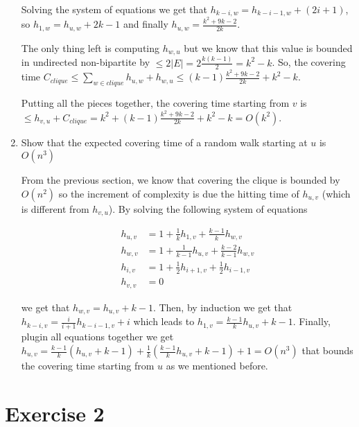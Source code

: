 \documentclass[12pt, a4paper]{article} %
\begin{document}
\begin{enumerate}[label=(\alph*)]
        Solving the system of equations we get that $h_{k-i,w} = h_{k-i-1, w} + (2i + 1)$, so $h_{1,w} = h_{u,w} + 2k - 1$ and finally $h_{u,w} = \frac{k^{2} + 9k - 2}{2k}$.

        The only thing left is computing $h_{w,u}$ but we know that this value is bounded in undirected non-bipartite by $\leq 2|E| = 2\frac{k(k-1)}{2} = k^{2} - k$. So, the covering time ${C_{clique} \leq \sum_{w \in clique} h_{u,w} + h_{w,u} \leq (k - 1) \frac{k^{2} + 9k - 2}{2k} + k^{2} - k}$.

        Putting all the pieces together, the covering time starting from $v$ is $\leq h_{v,u} + C_{clique} = k^{2} + (k - 1) \frac{k^{2} + 9k - 2}{2k} + k^{2} - k = O(k^{2})$.

  \item Show that the expected covering time of a random walk starting at $u$ is $O(n^{3})$

        From the previous section, we know that covering the clique is bounded by $O(n^{2})$ so the increment of complexity is due the hitting time of $h_{u,v}$ (which is different from $h_{v,u}$). By solving the following system of equations

        \begin{align*}
          h_{u,v} &=  1 + \frac{1}{k}h_{1,v} + \frac{k-1}{k} h_{w,v}\\
          h_{w,v} &=  1 + \frac{1}{k-1}h_{u,v} + \frac{k-2}{k-1} h_{w,v}\\
          h_{i,v} &=  1 + \frac{1}{2}h_{i+1,v} + \frac{1}{2} h_{i-1,v}\\
          h_{v,v} &=  0
        \end{align*}

        we get that $h_{w,v} = h_{u,v} + k - 1$. Then, by induction we get that $h_{k-i,v} = \frac{i}{i+1}h_{k-i-1,v} + i$ which leads to $h_{1,v} = \frac{k-1}{k}h_{u,v} + k - 1$. Finally, plugin all equations together we get $h_{u,v} = \frac{k-1}{k}(h_{u,v} + k - 1) + \frac{1}{k}(\frac{k-1}{k}h_{u,v} + k - 1) + 1 = O(n^{3})$ that bounds the covering time starting from $u$ as we mentioned before.

\end{enumerate}


\section*{Exercise 2}%
\label{sec:exercise_2}
\end{document}

